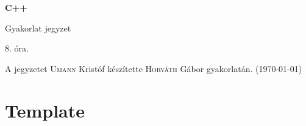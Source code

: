 \documentclass[a4paper,11.5pt,table]{article}
\begin{document}
	\setlength\parindent{0pt}
	\def\<{<\hspace{0mm}<}
	
	\theoremstyle{definition}
	\newtheorem{note}{Megjegyzés}[subsection]
	
	\begin{center}
		{\LARGE\textbf{C++}}
		
		{\Large Gyakorlat jegyzet}
		
		8. óra.
	\end{center}
	A jegyzetet \textsc{Umann} Kristóf készítette \textsc{Horváth} Gábor gyakorlatán. (\today)
	
	\section{Template}
\end{document}

